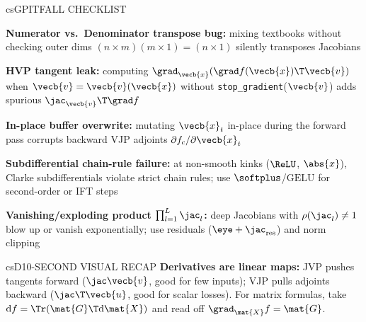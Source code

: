 \documentclass[../../../../master.tex]{subfiles}
\begin{document}
\begin{cscolumns}
\begin{cscard}{csG}{PITFALL CHECKLIST}
  \begin{csbul}
    \item \textbf{Numerator vs.\ Denominator transpose bug:} mixing textbooks without checking outer dims $(n\times m)(m\times 1)=(n\times 1)$ silently transposes Jacobians
    \item \textbf{HVP tangent leak:} computing $\grad_{\vecb{x}}(\grad f(\vecb{x})\T\vecb{v})$ when $\vecb{v}=\vecb{v}(\vecb{x})$ without \texttt{stop\_gradient}($\vecb{v}$) adds spurious $\jac_{\vecb{v}}\T\grad f$
    \item \textbf{In-place buffer overwrite:} mutating $\vecb{x}_t$ in-place during the forward pass corrupts backward VJP adjoints $\partial f_c/\partial \vecb{x}_t$
    \item \textbf{Subdifferential chain-rule failure:} at non-smooth kinks ($\ReLU$, $\abs{x}$), Clarke subdifferentials violate strict chain rules; use $\softplus$/$\mathrm{GELU}$ for second-order or IFT steps
    \item \textbf{Vanishing/exploding product $\prod_{l=1}^L \jac_l$:} deep Jacobians with $\rho(\jac_l)\neq 1$ blow up or vanish exponentially; use residuals ($\eye+\jac_{\mathrm{res}}$) and norm clipping
  \end{csbul}
\end{cscard}

\begin{cscard}{csD}{10-SECOND VISUAL RECAP}
  \sffamily\footnotesize
  \textbf{Derivatives are linear maps:} JVP pushes tangents forward ($\jac\vecb{v}$, good for few inputs); VJP pulls adjoints backward ($\jac\T\vecb{u}$, good for scalar losses).
  For matrix formulas, take $\mathrm{d}f = \Tr(\mat{G}\T\mathrm{d}\mat{X})$ and read off $\grad_{\mat{X}} f = \mat{G}$.
\end{cscard}
\end{cscolumns}

\csend
\end{document}

